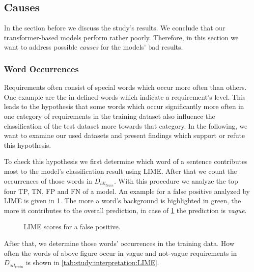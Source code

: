 \subsection{Causes}
\label{chp:study:sec:interpretation:subsec:causes}
In the section before we discuss the study's results.
We conclude that our transformer-based models perform rather poorly.
Therefore, in this section we want to address possible \textit{causes} for the models' bad results.

\subsubsection{Word Occurrences}
\label{chp:study:sec:interpretation:subsec:causes:word_occurrences}
Requirements often consist of special words which occur more often than others.
One example are the in  \parencite{Bradner:1997} defined words which indicate a requirement's level.
This leads to the hypothesis that some words which occur significantly more often in one category of requirements in the training dataset also influence the classification of the test dataset more towards that category.
In the following, we want to examine our used datasets and present findings which support or refute this hypothesis.

To check this hypothesis we first determine which word of a sentence contributes most to the model's classification result using \ac{LIME}.
After that we count the occurrences of those words in $D_{all_{train}}$.
With this procedure we analyze the top four \ac{TP}, \ac{TN}, \ac{FP} and \ac{FN} of a model.
An example for a false positive analyzed by \ac{LIME} is given in \cref{fig:study:interpretation:LIME}.
The more a word's background is highlighted in green, the more it contributes to the overall prediction, in case of \cref{fig:study:interpretation:LIME} the prediction is \textit{vague}.
\newpage %
\begin{figure}[htpb]
    \centering
    \def\svgwidth{\columnwidth}
    
    \caption[Study Interpretation: Example for LIME]{LIME scores for a false positive.}\label{fig:study:interpretation:LIME}
\end{figure}

After that, we determine those words' occurrences in the training data.
How often the words of above figure occur in vague and not-vague requirements in $D_{all_{train}}$ is shown in \cref{tab:study:interpretation:LIME}.

